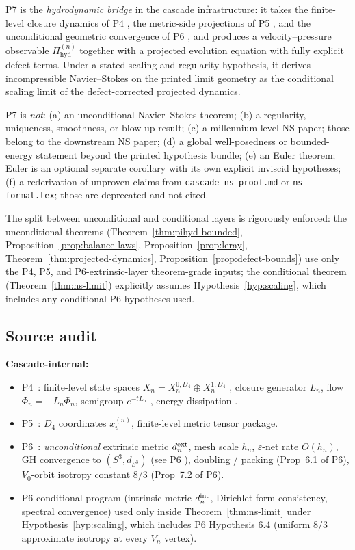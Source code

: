 \documentclass[11pt, a4paper]{amsart}
\theoremstyle{definition}
\newcommand{\dsph}{d_{S^3}}
\newcommand{\Pihyd}{\Pi_{\mathrm{hyd}}}
\begin{document}
P7 is the \emph{hydrodynamic bridge} in the cascade
infrastructure: it takes the finite-level closure dynamics of
P4 \cite{ClosureDynamics}, the metric-side projections of P5
\cite{MetricProjection}, and the unconditional geometric
convergence of P6 \cite{SchlafliConvergence}, and produces a
velocity--pressure observable $\Pihyd^{(n)}$ together with a
projected evolution equation with fully explicit defect terms.
Under a stated scaling and regularity hypothesis, it derives
incompressible Navier--Stokes on the printed limit geometry as
the conditional scaling limit of the defect-corrected projected
dynamics.

P7 is \emph{not}:
(a) an unconditional Navier--Stokes theorem;
(b) a regularity, uniqueness, smoothness, or blow-up result;
(c) a millennium-level NS paper; those belong to the downstream
NS paper;
(d) a global well-posedness or bounded-energy statement beyond
the printed hypothesis bundle;
(e) an Euler theorem; Euler is an optional separate corollary
with its own explicit inviscid hypotheses;
(f) a rederivation of unproven claims from
\texttt{cascade-ns-proof.md} or \texttt{ns-formal.tex}; those
are deprecated and not cited.

The split between unconditional and conditional layers is
rigorously enforced: the unconditional theorems
(Theorem~\ref{thm:pihyd-bounded},
Proposition~\ref{prop:balance-laws},
Proposition~\ref{prop:leray},
Theorem~\ref{thm:projected-dynamics},
Proposition~\ref{prop:defect-bounds}) use only the P4, P5, and
P6-extrinsic-layer theorem-grade inputs; the conditional theorem
(Theorem~\ref{thm:ns-limit}) explicitly assumes
Hypothesis~\ref{hyp:scaling}, which includes any conditional P6
hypotheses used.

\subsection{Source audit}

\textbf{Cascade-internal:}
\begin{itemize}
\item P4~\cite{ClosureDynamics}: finite-level state spaces $X_n
  = X_n^{0, D_4} \oplus X_n^{1, D_4}$
  \cite[Def.~2.1]{ClosureDynamics}, closure generator $L_n$, flow
  $\dot\Phi_n = -L_n \Phi_n$, semigroup $e^{-tL_n}$
  \cite[Thm.~4.2]{ClosureDynamics}, energy dissipation
  \cite[Prop.~5.1]{ClosureDynamics}.
\item P5~\cite{MetricProjection}: $D_4$ coordinates
  $x_v^{(n)}$, finite-level metric tensor package.
\item P6~\cite{SchlafliConvergence}: \emph{unconditional}
  extrinsic metric $d_n^{\rm ext}$, mesh scale $h_n$,
  $\varepsilon$-net rate $O(h_n)$, GH convergence to $(S^3,
  \dsph)$ (see P6 \cite[Thm.~4.2, Thm.~5.1]{SchlafliConvergence}),
  doubling / packing
  (Prop~6.1 of P6), $V_0$-orbit isotropy constant $8/3$
  (Prop~7.2 of P6).
\item P6 conditional program (intrinsic metric
  $d_n^{\rm int}$, Dirichlet-form consistency, spectral
  convergence) used only inside Theorem~\ref{thm:ns-limit}
  under Hypothesis~\ref{hyp:scaling}, which includes P6
  Hypothesis 6.4 (uniform $8/3$ approximate isotropy at every
  $V_n$ vertex).
\end{itemize}
\end{document}
